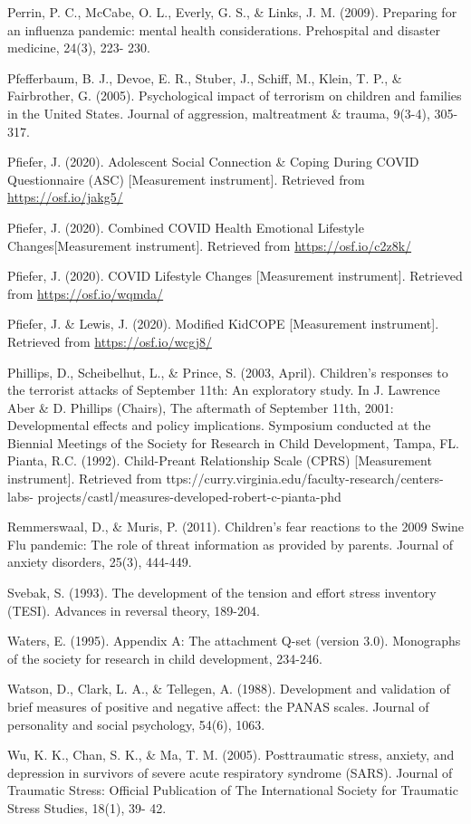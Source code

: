 \documentclass[]{book}
\begin{document}
Perrin, P. C., McCabe, O. L., Everly, G. S., \& Links, J. M. (2009). Preparing for an influenza
pandemic: mental health considerations. Prehospital and disaster medicine, 24(3), 223-
230.

Pfefferbaum, B. J., Devoe, E. R., Stuber, J., Schiff, M., Klein, T. P., \& Fairbrother, G. (2005).
Psychological impact of terrorism on children and families in the United States. Journal
of aggression, maltreatment \& trauma, 9(3-4), 305-317.

Pfiefer, J. (2020). Adolescent Social Connection \& Coping During COVID Questionnaire (ASC)
{[}Measurement instrument{]}. Retrieved from \url{https://osf.io/jakg5/}

Pfiefer, J. (2020). Combined COVID Health Emotional Lifestyle Changes{[}Measurement
instrument{]}. Retrieved from \url{https://osf.io/c2z8k/}

Pfiefer, J. (2020). COVID Lifestyle Changes {[}Measurement instrument{]}. Retrieved from
\url{https://osf.io/wqmda/}

Pfiefer, J. \& Lewis, J. (2020). Modified KidCOPE {[}Measurement instrument{]}. Retrieved from
\url{https://osf.io/wcgj8/}

Phillips, D., Scheibelhut, L., \& Prince, S. (2003, April). Children's responses to the terrorist
attacks of September 11th: An exploratory study. In J. Lawrence Aber \& D. Phillips
(Chairs), The aftermath of September 11th, 2001: Developmental effects and policy
implications. Symposium conducted at the Biennial Meetings of the Society for Research
in Child Development, Tampa, FL.
Pianta, R.C. (1992). Child-Preant Relationship Scale (CPRS) {[}Measurement instrument{]}.
Retrieved from ttps://curry.virginia.edu/faculty-research/centers-labs-
projects/castl/measures-developed-robert-c-pianta-phd

Remmerswaal, D., \& Muris, P. (2011). Children's fear reactions to the 2009 Swine Flu
pandemic: The role of threat information as provided by parents. Journal of anxiety
disorders, 25(3), 444-449.

Svebak, S. (1993). The development of the tension and effort stress inventory (TESI). Advances
in reversal theory, 189-204.

Waters, E. (1995). Appendix A: The attachment Q-set (version 3.0). Monographs of the society
for research in child development, 234-246.

Watson, D., Clark, L. A., \& Tellegen, A. (1988). Development and validation of brief measures
of positive and negative affect: the PANAS scales. Journal of personality and social
psychology, 54(6), 1063.

Wu, K. K., Chan, S. K., \& Ma, T. M. (2005). Posttraumatic stress, anxiety, and depression in
survivors of severe acute respiratory syndrome (SARS). Journal of Traumatic Stress:
Official Publication of The International Society for Traumatic Stress Studies, 18(1), 39-
42.


\end{document}
